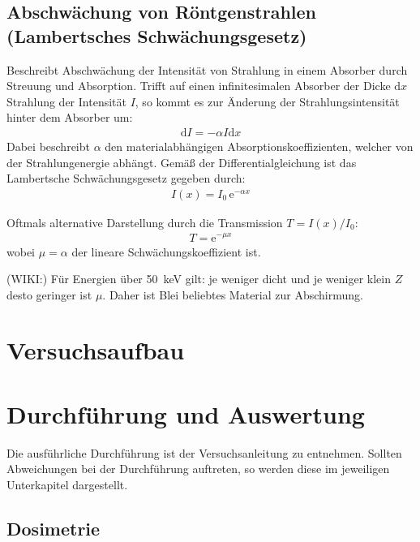 \documentclass[11pt, a4paper]{article}
\numberwithin{equation}{section}
\begin{document}
\subsection{Abschwächung von Röntgenstrahlen (Lambertsches Schwächungsgesetz)}
Beschreibt Abschwächung der Intensität von Strahlung in einem Absorber durch Streuung und Absorption.
Trifft auf einen infinitesimalen Absorber der Dicke $\mathrm{d} x$ Strahlung der Intensität $I$, so kommt es zur Änderung der Strahlungsintensität hinter dem Absorber um:
\begin{align}
	\mathrm{d} I = - \alpha I \mathrm{d} x
\end{align}
Dabei beschreibt $\alpha$ den materialabhängigen Absorptionskoeffizienten, welcher von der Strahlungenergie abhängt.
Gemäß der Differentialgleichung ist das Lambertsche Schwächungsgesetz gegeben durch:
\begin{align}
	I(x) = I_0 \, \mathrm{e}^{-\alpha x}
\end{align}

Oftmals alternative Darstellung durch die Transmission $T = I(x)/I_0$:
\begin{align}
	T = \mathrm{e}^{-\mu x}
\end{align}
wobei $\mu = \alpha$ der lineare Schwächungskoeffizient ist.

(WIKI:) Für Energien über \SI{50}{keV} gilt:
je weniger dicht und je weniger klein $Z$ desto geringer ist $\mu$. Daher ist Blei beliebtes Material zur Abschirmung.

\section{Versuchsaufbau}

\section{Durchführung und Auswertung}
Die ausführliche Durchführung ist der Versuchsanleitung \cite{anleitung} zu entnehmen.
Sollten Abweichungen bei der Durchführung auftreten, so werden diese im jeweiligen Unterkapitel dargestellt.

\subsection{Dosimetrie}
\end{document}
